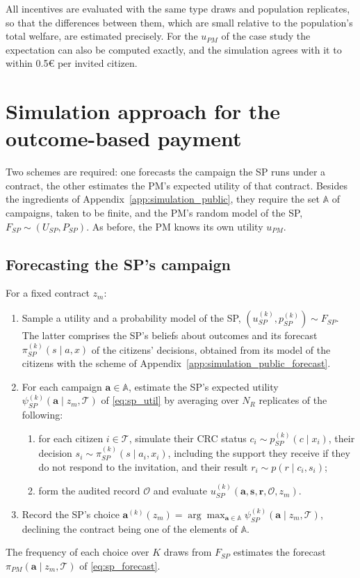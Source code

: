\documentclass[12pt]{article}
\begin{document}
All incentives are evaluated with the same type draws and population replicates, so that the differences between them, which are small relative to the population's total welfare, are estimated precisely. For the $u_{PM}$ of the case study the expectation can also be computed exactly, and the simulation agrees with it to within 0.5€ per invited citizen.


\section{Simulation approach for the outcome-based payment}\label{app:simulation_OBP}
Two schemes are required: one forecasts the campaign the SP runs under a contract, the other estimates the PM's expected utility of that contract. Besides the ingredients of Appendix~\ref{app:simulation_public}, they require the set $\mathbb{A}$ of campaigns, taken to be finite, and the PM's random model of the SP, $F_{SP} \sim (U_{SP}, P_{SP})$. As before, the PM knows its own utility $u_{PM}$.

\subsection{Forecasting the SP's campaign}\label{app:simulation_OBP_incentive}
For a fixed contract $z_m$:
\begin{enumerate}
  \item Sample a utility and a probability model of the SP, $(u^{(k)}_{SP}, p^{(k)}_{SP}) \sim F_{SP}$. The latter comprises the SP's beliefs about outcomes and its forecast $\pi^{(k)}_{SP}(s \mid a, x)$ of the citizens' decisions, obtained from its model of the citizens with the scheme of Appendix~\ref{app:simulation_public_forecast}.
  \item For each campaign $\mathbf{a} \in \mathbb{A}$, estimate the SP's expected utility $\psi^{(k)}_{SP}(\mathbf{a} \mid z_m, \mathcal{T})$ of \eqref{eq:sp_util} by averaging over $N_R$ replicates of the following:
  \begin{enumerate}
    \item for each citizen $i \in \mathcal{T}$, simulate their CRC status $c_i \sim p^{(k)}_{SP}(c \mid x_i)$, their decision $s_i \sim \pi^{(k)}_{SP}(s \mid a_i, x_i)$, including the support they receive if they do not respond to the invitation, and their result $r_i \sim p(r \mid c_i, s_i)$;
    \item form the audited record $\mathcal{O}$ and evaluate $u^{(k)}_{SP}(\mathbf{a}, \mathbf{s}, \mathbf{r}, \mathcal{O}, z_m)$.
  \end{enumerate}
  \item Record the SP's choice $\mathbf{a}^{(k)}(z_m) = \arg\max_{\mathbf{a} \in \mathbb{A}} \psi^{(k)}_{SP}(\mathbf{a} \mid z_m, \mathcal{T})$, declining the contract being one of the elements of $\mathbb{A}$.
\end{enumerate}
The frequency of each choice over $K$ draws from $F_{SP}$ estimates the forecast $\pi_{PM}(\mathbf{a} \mid z_m, \mathcal{T})$ of \eqref{eq:sp_forecast}.
\end{document}
